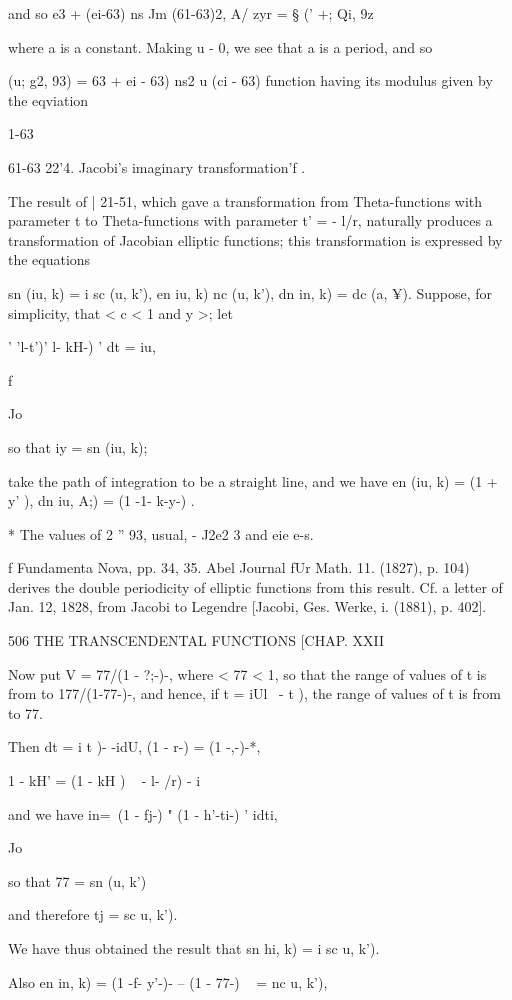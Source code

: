 and so e3 + (ei-63) ns Jm (61-63)2, A/ zyr = § (' +; Qi, 9z\

where a is a constant. Making u - 0, we see that a is a period, and so

  (u; g2, 93) = 63 + ei - 63) ns2 u (ci - 63)%
function having its modulus given by the eqviation

1-63

61-63 22'4. Jacobi's imaginary transformation'f .

The result of | 21-51, which gave a transformation from
Theta-functions with parameter t to Theta-functions with parameter t'
= - l/r, naturally produces a transformation of Jacobian elliptic
functions; this transformation is expressed by the equations

sn (iu, k) = i sc (u, k'), en iu, k) nc (u, k'), dn in, k) = dc (a,
¥). Suppose, for simplicity, that < c < 1 and y >; let

' 'l-t')' l- kH-) ' dt = iu,

f

Jo

so that iy = sn (iu, k);

take the path of integration to be a straight line, and we have en
(iu, k) = (1 + y' ), dn iu, A;) = (1 -1- k-y-) .

* The values of 2 '' 93, usual, - J2e2 3 and eie e-s.

f Fundamenta Nova, pp. 34, 35. Abel Journal fUr Math. 11. (1827), p.
104) derives the double periodicity of elliptic functions from this
result. Cf. a letter of Jan. 12, 1828, from Jacobi to Legendre
[Jacobi, Ges. Werke, i. (1881), p. 402].

506 THE TRANSCENDENTAL FUNCTIONS [CHAP. XXII

Now put V = 77/(1 - ?;-)-, where < 77 < 1, so that the range of values
of t is from to 177/(1-77-)-, and hence, if t = iUl \ - t ), the
range of values of t is from to 77.

Then dt = i t )- -idU, (1 - r-) = (1 -,-)-*,

1 - kH' = (1 - kH ) ~ - l- /r) - i

and we have in=\ (1 - fj-) " (1 - h'-ti-) ' idti,

Jo

so that 77 = sn (u, k')

and therefore tj = sc u, k').

We have thus obtained the result that sn hi, k) = i sc u, k').

Also en in, k) = (1 -f- y'-)- -- (1 - 77-) ~ = nc u, k'),

